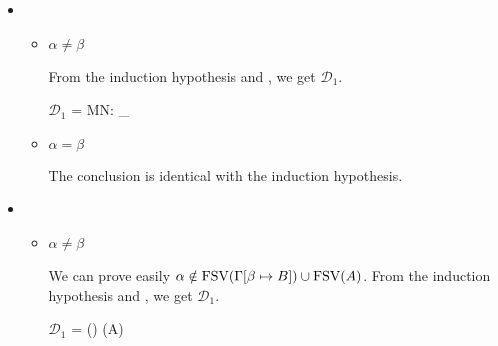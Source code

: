 \begin{itemize}
\begin{itemize}
	      	      $\mathcal{D}_1$ = 
	      	      {\GGV M\SB \E N\SB @A\alpha\SB}
	      	      	      	      	      	      
	      	\item $\alpha = \beta$
	      	      	      	      	      	      
	      	      The conclusion is identical with the induction hypothesis.
	      	      	      	      	      	      
	      \end{itemize}
	      	      	      
	\item \QTBL
	      	      	      
	      \begin{itemize}
	      		      		      	
	      	\item $\alpha \neq \beta$
	      	      	      	      	      	      
	      	      From the induction hypothesis and \QTBL, we get $\mathcal{D}_1$.
	      	      	      	      	      	      
	      	      $\mathcal{D}_1$ = 
	      	      {\GGV M\SB \E N\SB : \TW_\alpha \tau@A\SB}
	      	      	      	      	      	      
	      	\item $\alpha = \beta$
	      	      	      	      	      	      
	      	      The conclusion is identical with the induction hypothesis.
	      	      	      	      	      	      
	      \end{itemize}
	      	      	      
	\item \QGen
	      	      	      
	      \begin{itemize}
	      		      		      	
	      	\item $\alpha \neq \beta$
	      	      	      	      	      	      
	      	      We can prove easily $\alpha \notin \text{FSV}(\Gamma[\beta \mapsto B]) \cup \text{FSV}(A)$.
	      	      From the induction hypothesis and \QGen, we get $\mathcal{D}_1$.
	      	      	      	      	      	      
	      	      $\mathcal{D}_1$ = 
	      	      { \andalso \alpha \notin \FTV(\GG) \cup \FTV(A)}
	      	      	      	      	      	      

\end{itemize}
\end{itemize}
